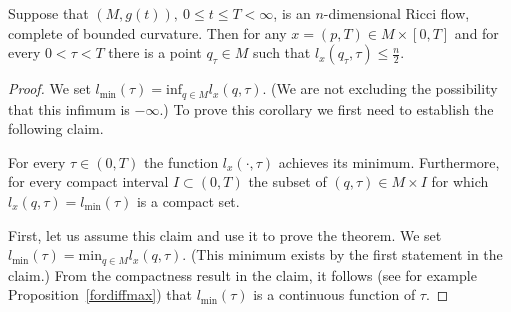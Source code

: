 \begin{theorem}
\label{thm:min-l-bound-n-half}
\label{n/2} Suppose that $(M,g(t)),\ 0\le t\le T<\infty$,
is an $n$-dimensional Ricci flow, complete of bounded curvature.
Then for any $x=(p,T)\in M\times [0,T]$ and for every $0<\tau<T$
there is a point $q_\tau\in M$ such that $l_{x}(q_\tau,\tau)\le
\frac{n}{2}$.
\end{theorem}

\begin{proof}
We set $l_\mathrm{min}(\tau)=\mathrm{inf}_{q\in
M}l_x(q,\tau)$. (We are not excluding the
possibility that this infimum is $-\infty$.) To prove this corollary
we first need to establish the following claim.

\begin{claim}
\label{claim:l-min-achieved-compact}
\label{8.1}
For every
 $\tau\in (0,T)$ the function
$l_x(\cdot,\tau)$ achieves its minimum. Furthermore,
for every compact interval $I\subset (0,T)$ the subset of
$(q,\tau)\in M\times I$
 for which $l_x(q,\tau)=l_\mathrm{min}(\tau)$ is a compact set.
\end{claim}

 First, let us assume this claim and use it to prove the
theorem. We set $l_\mathrm{min}(\tau)=\mathrm{min}_{q\in M}l_x(q,\tau)$.
(This minimum exists by the first statement in the claim.) From the
compactness result in the claim, it follows (see for example
Proposition~\ref{fordiffmax}) that $l_\mathrm{min}(\tau)$ is a
continuous function of $\tau$.


\end{proof}
